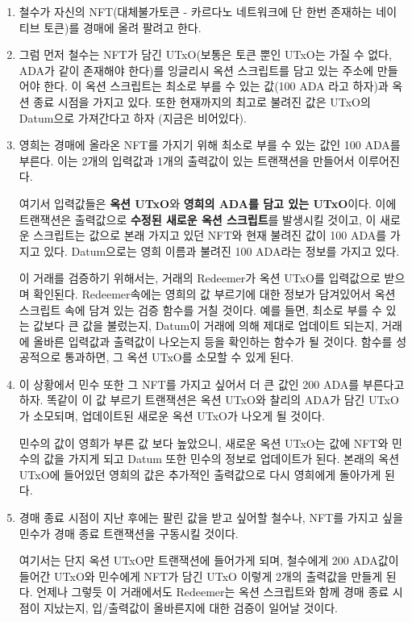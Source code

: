 \documentclass[a4paper, 11pt]{article}
\begin{document}
    \begin{enumerate}
        \item 철수가 자신의 NFT(대체불가토큰 - 카르다노 네트워크에 단 한번 존재하는 네이티브 토큰)를 경매에 올려 팔려고 한다.
        \item 그럼 먼저 철수는 NFT가 담긴 UTxO(보통은 토큰 뿐인 UTxO는 가질 수 없다, ADA가 같이 존재해야 한다)를 잉글리시 옥션 스크립트를 담고 있는 주소에 만들어야 한다. 이 옥션 스크립트는 최소로 부를 수 있는 값(100 ADA 라고 하자)과 옥션 종료 시점을 가지고 있다. 또한 현재까지의 최고로 불려진 값은 UTxO의 Datum으로 가져간다고 하자 (지금은 비어있다).
        \item 영희는 경매에 올라온 NFT를 가지기 위해 최소로 부를 수 있는 값인 100 ADA를 부른다. 이는 2개의 입력값과 1개의 출력값이 있는 트랜잭션을 만들어서 이루어진다.
        
        여기서 입력값들은 \textbf{옥션 UTxO}와 \textbf{영희의 ADA를 담고 있는 UTxO}이다. 이에 트랜잭션은 출력값으로 \textbf{수정된 새로운 옥션 스크립트}를 발생시킬 것이고, 이 새로운 스크립트는 값으로 본래 가지고 있던 NFT와 현재 불려진 값이 100 ADA를 가지고 있다. Datum으로는 영희 이름과 불려진 100 ADA라는 정보를 가지고 있다.

        이 거래를 검증하기 위해서는, 거래의 Redeemer가 옥션 UTxO를 입력값으로 받으며 확인된다. Redeemer속에는 영희의 값 부르기에 대한 정보가 담겨있어서 옥션 스크립트 속에 담겨 있는 검증 함수를 거칠 것이다. 예를 들면, 최소로 부를 수 있는 값보다 큰 값을 불렀는지, Datum이 거래에 의해 제대로 업데이트 되는지, 거래에 올바른 입력값과 출력값이 나오는지 등을 확인하는 함수가 될 것이다. 함수를 성공적으로 통과하면, 그 옥션 UTxO를 소모할 수 있게 된다.
        \item 이 상황에서 민수 또한 그 NFT를 가지고 싶어서 더 큰 값인 200 ADA를 부른다고 하자. 똑같이 이 값 부르기 트랜잭션은 옥션 UTxO와 찰리의 ADA가 담긴 UTxO가 소모되며, 업데이트된 새로운 옥션 UTxO가 나오게 될 것이다.
        
        민수의 값이 영희가 부른 값 보다 높았으니, 새로운 옥션 UTxO는 값에 NFT와 민수의 값을 가지게 되고 Datum 또한 민수의 정보로 업데이트가 된다. 본래의 옥션 UTxO에 들어있던 영희의 값은 추가적인 출력값으로 다시 영희에게 돌아가게 된다.
        \item 경매 종료 시점이 지난 후에는 팔린 값을 받고 싶어할 철수나, NFT를 가지고 싶을 민수가 경매 종료 트랜잭션을 구동시킬 것이다. 
        
        여기서는 단지 옥션 UTxO만 트랜잭션에 들어가게 되며, 철수에게 200 ADA값이 들어간 UTxO와 민수에게 NFT가 담긴 UTxO 이렇게 2개의 출력값을 만들게 된다. 언제나 그렇듯 이 거래에서도 Redeemer는 옥션 스크립트와 함께 경매 종료 시점이 지났는지, 입/출력값이 올바른지에 대한 검증이 일어날 것이다.


\end{enumerate}
\end{document}
